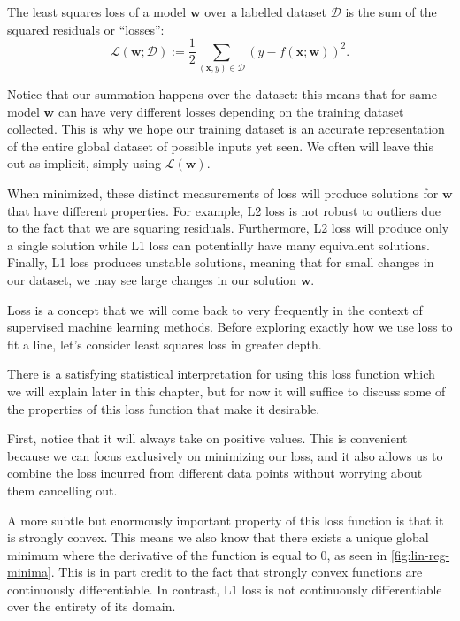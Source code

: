 \begin{definition}
    The least squares loss of a model $\bm w$ over a labelled dataset $\mathcal D$ is the sum of the squared residuals or ``losses'': $$\mathcal L(\bm w; \mathcal D) := \frac12 \sum_{(\bm x, y) \in \mathcal D} (y - f(\bm x; \bm w))^2.$$
\end{definition}

\begin{warning}
    Notice that our summation happens over the dataset: this means that for same model $\bm w$ can have very different losses depending on the training dataset collected. This is why we hope our training dataset is an accurate representation of the entire global dataset of possible inputs yet seen. We often will leave this out as implicit, simply using $\mathcal L(\bm w)$.
\end{warning}

When minimized, these distinct measurements of loss will produce solutions for $\bm w$ that have different properties. For example, L2 loss is not robust to outliers due to the fact that we are squaring residuals. Furthermore, L2 loss will produce only a single solution while L1 loss can potentially have many equivalent solutions. Finally, L1 loss produces unstable solutions, meaning that for small changes in our dataset, we may see large changes in our solution $\bm{w}$.

Loss is a concept that we will come back to very frequently in the context of supervised machine learning methods. Before exploring exactly how we use loss to fit a line, let's consider least squares loss in greater depth.


There is a satisfying statistical interpretation for using this loss function which we will explain later in this chapter, but for now it will suffice to discuss some of the properties of this loss function that make it desirable.

First, notice that it will always take on positive values. This is convenient because we can focus exclusively on minimizing our loss, and it also allows us to combine the loss incurred from different data points without worrying about them cancelling out.

A more subtle but enormously important property of this loss function is that it is strongly convex. This means we also know that there exists a unique global minimum where the derivative of the function is equal to 0, as seen in \autoref{fig:lin-reg-minima}. This is in part credit to the fact that strongly convex functions are continuously differentiable. In contrast, L1 loss is not continuously differentiable over the entirety of its domain.

